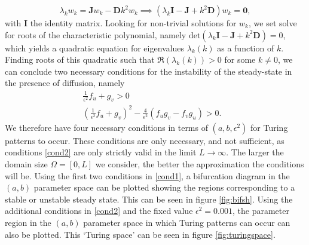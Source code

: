 \documentclass[12pt]{report}
\begin{document}
$$
\lambda_k w_k=\textbf{J}w_k-\textbf{D}k^2w_k \implies (\lambda_k \textbf{I}-\textbf{J}+k^2\textbf{D})w_k=\textbf{0},
$$
with $\textbf{I}$ the identity matrix. Looking for non-trivial solutions for $w_k$, we set solve for roots of the characteristic polynomial, namely $\text{det}(\lambda_k \textbf{I}-\textbf{J}+k^2\textbf{D})=0$, which yields a quadratic equation for eigenvalues $\lambda_k(k)$ as a function of $k$. Finding roots of this quadratic such that $\Re(\lambda_k(k))>0$ for some $k\neq0$, we can conclude two necessary conditions for the instability of the steady-state in the presence of diffusion, namely
\begin{equation}\label{cond2}
    \begin{split}
    \frac{1}{\epsilon^2}f_u+g_v>0&\\
    \left(\frac{1}{\epsilon^2}f_u+g_v\right)^2-\frac{4}{\epsilon^2}(f_ug_v-f_vg_u)>0.
\end{split}
\end{equation}
We therefore have four necessary conditions in terms of $(a,b,\epsilon^2)$ for Turing patterns to occur. These conditions are only necessary, and not sufficient, as conditions \eqref{cond2} are only strictly valid in the limit $L\to\infty$. The larger the domain size $\Omega=[0,L]$ we consider, the better the approximation the conditions will be. Using the first two conditions in \eqref{cond1}, a bifurcation diagram in the $(a,b)$ parameter space can be plotted showing the regions corresponding to a stable or unstable steady state. This can be seen in figure \ref{fig:bifsh}. Using the additional conditions in \eqref{cond2} and the fixed value $\epsilon^2=0.001$, the parameter region in the $(a,b)$ parameter space in which Turing patterns can occur can also be plotted. This `Turing space' can be seen in figure \ref{fig:turingspace}.
\end{document}
